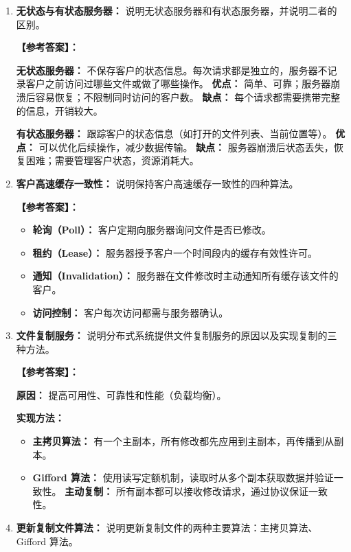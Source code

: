 \documentclass[a4paper,12pt]{article}
\newcommand{\answer}[1]{\par\vspace{0.5em}\hspace{2em}\textbf{【参考答案】：}\\{\color{blue}#1}\par\vspace{1em}}
\begin{document}
\begin{enumerate}[label=\arabic*.]
    \item \textbf{无状态与有状态服务器：}
    说明无状态服务器和有状态服务器，并说明二者的区别。
    
    \answer{
    \textbf{无状态服务器：} 不保存客户的状态信息。每次请求都是独立的，服务器不记录客户之前访问过哪些文件或做了哪些操作。
    \textbf{优点：} 简单、可靠；服务器崩溃后容易恢复；不限制同时访问的客户数。
    \textbf{缺点：} 每个请求都需要携带完整的信息，开销较大。
    
    \textbf{有状态服务器：} 跟踪客户的状态信息（如打开的文件列表、当前位置等）。
    \textbf{优点：} 可以优化后续操作，减少数据传输。
    \textbf{缺点：} 服务器崩溃后状态丢失，恢复困难；需要管理客户状态，资源消耗大。
    }

    \item \textbf{客户高速缓存一致性：}
    说明保持客户高速缓存一致性的四种算法。
    
    \answer{
    \begin{itemize}
        \item \textbf{轮询（Poll）：} 客户定期向服务器询问文件是否已修改。
        \item \textbf{租约（Lease）：} 服务器授予客户一个时间段内的缓存有效性许可。
        \item \textbf{通知（Invalidation）：} 服务器在文件修改时主动通知所有缓存该文件的客户。
        \item \textbf{访问控制：} 客户每次访问都需与服务器确认。
    \end{itemize}
    }

    \item \textbf{文件复制服务：}
    说明分布式系统提供文件复制服务的原因以及实现复制的三种方法。
    
    \answer{
    \textbf{原因：} 提高可用性、可靠性和性能（负载均衡）。
    
    \textbf{实现方法：}
    \begin{itemize}
        \item \textbf{主拷贝算法：} 有一个主副本，所有修改都先应用到主副本，再传播到从副本。
        \item \textbf{Gifford 算法：} 使用读写定额机制，读取时从多个副本获取数据并验证一致性。
        \textbf{主动复制：} 所有副本都可以接收修改请求，通过协议保证一致性。
    \end{itemize}
    }

    \item \textbf{更新复制文件算法：}
    说明更新复制文件的两种主要算法：主拷贝算法、Gifford 算法。
    

\end{enumerate}
\end{document}
